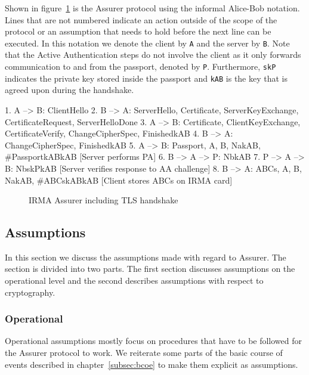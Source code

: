Shown in figure~\ref{fig:assurer} is the Assurer protocol using the informal Alice-Bob notation. Lines that are not numbered indicate an action outside of the scope of the protocol or an assumption that needs to hold before the next line can be executed. In this notation we denote the client by \texttt{A} and the server by \texttt{B}. Note that the Active Authentication steps do not involve the client as it only forwards communication to and from the passport, denoted by \texttt{P}. Furthermore, \texttt{skP} indicates the private key stored inside the passport and \texttt{kAB} is the key that is agreed upon during the handshake.

\begin{verbbox}
1. A --> B: ClientHello
2. B --> A: ServerHello, Certificate, ServerKeyExchange, 
            CertificateRequest, ServerHelloDone
3. A --> B: Certificate, ClientKeyExchange, CertificateVerify, 
            ChangeCipherSpec, {Finished}kAB
4. B --> A: ChangeCipherSpec, {Finished}kAB
5. A --> B: {{Passport, A, B, Na}kAB, #{Passport}kAB}kAB
   [Server performs PA]  
6. B --> A --> P: {Nb}kAB
7. P --> A --> B: {{Nb}skP}kAB
   [Server verifies response to AA challenge]  
8. B --> A: {{ABCs, A, B, Na}kAB, #{ABCs}kAB}kAB
   [Client stores ABCs on IRMA card]
\end{verbbox}

\begin{figure}[htb]
\centering
\theverbbox
\caption{IRMA Assurer including TLS handshake}
\label{fig:assurer}
\end{figure}

\subsection{Assumptions}
\label{sec:assumptions}
In this section we discuss the assumptions made with regard to Assurer. The section is divided into two parts. The first section discusses assumptions on the operational level and the second describes assumptions with respect to cryptography.

\subsubsection{Operational}
Operational assumptions mostly focus on procedures that have to be followed for the Assurer protocol to work. We reiterate some parts of the basic course of events described in chapter~\ref{subsec:bcoe} to make them explicit as assumptions. 

